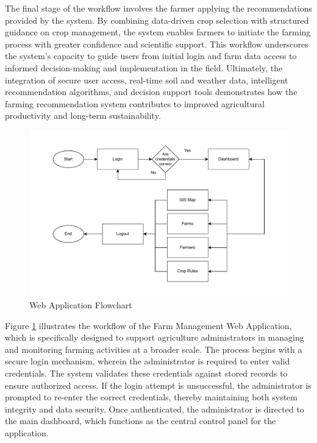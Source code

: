 {	The final stage of the workflow involves the farmer applying the recommendations provided by the system. By combining data-driven crop selection with structured guidance on crop management, the system enables farmers to initiate the farming process with greater confidence and scientific support. This workflow underscores the system’s capacity to guide users from initial login and farm data access to informed decision-making and implementation in the field. Ultimately, the integration of secure user access, real-time soil and weather data, intelligent recommendation algorithms, and decision support tools demonstrates how the farming recommendation system contributes to improved agricultural productivity and long-term sustainability.
	
	\begin{figure}[H]
		\centering
		\caption{Web Application Flowchart}
		\label{fig:WebFlowchart}
		\includegraphics[width=1\textwidth]{figures/web flow.pdf}
	\end{figure}
	
	Figure \ref{fig:WebFlowchart} illustrates the workflow of the Farm Management Web Application, which is specifically designed to support agriculture administrators in managing and monitoring farming activities at a broader scale. The process begins with a secure login mechanism, wherein the administrator is required to enter valid credentials. The system validates these credentials against stored records to ensure authorized access. If the login attempt is unsuccessful, the administrator is prompted to re-enter the correct credentials, thereby maintaining both system integrity and data security. Once authenticated, the administrator is directed to the main dashboard, which functions as the central control panel for the application.
	
}
